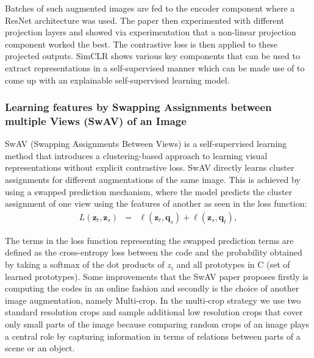 Batches of such augmented images are fed to the encoder component where a ResNet architecture was used. The paper then experimented with different projection layers and showed via experimentation that a non-linear projection component worked the best. The contrastive loss is then applied to these projected outputs. SimCLR shows various key components that can be used to extract representations in a self-supervised manner which can be made use of to come up with an explainable self-supervised learning model.

\subsubsection{Learning features by Swapping Assignments between multiple Views (SwAV) of an Image}
SwAV (Swapping Assignments Between Views) \cite{caron2020unsupervised} is a self-supervised learning method that introduces a clustering-based approach to learning visual representations without explicit contrastive loss. SwAV directly learns cluster assignments for different augmentations of the same image. This is achieved by using a swapped prediction mechanism, where the model predicts the cluster assignment of one view using the features of another as seen in the loss function:
\begin{eqnarray}
L(\mathbf{z}_t, \mathbf{z}_s) & = &\ell(\mathbf{z}_t, \mathbf{q}_s) + \ell(\mathbf{z}_s, \mathbf{q}_t),
\label{eq:twoviews}
\end{eqnarray}

The terms in the loss function representing the swapped prediction terms are defined as the cross-entropy loss between the code and the probability obtained by taking a softmax of the dot products of ${z_i}$ and all prototypes in C (set of learned prototypes). Some improvements that the SwAV paper proposes firstly is computing the codes in an online fashion and secondly is the choice of another image augmentation, namely Multi-crop. In the multi-crop strategy we use two standard resolution crops and sample additional low resolution crops that cover only small parts of the image because comparing random crops of an image plays a central role by capturing information in terms of relations between parts of a scene or an object.

